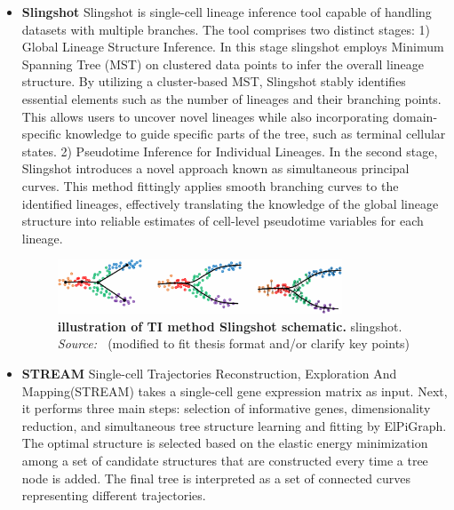 \begin{itemize}
    \item \textbf{Slingshot}
    Slingshot is single-cell lineage inference tool capable of handling datasets with multiple branches\citep{street2018slingshot}. The tool comprises two distinct stages: 1) Global Lineage Structure Inference. In this stage slingshot employs Minimum Spanning Tree (MST) on clustered data points to infer the overall lineage structure. By utilizing a cluster-based MST, Slingshot stably identifies essential elements such as the number of lineages and their branching points. This allows users to uncover novel lineages while also incorporating domain-specific knowledge to guide specific parts of the tree, such as terminal cellular states. 2) Pseudotime Inference for Individual Lineages. In the second stage, Slingshot introduces a novel approach known as simultaneous principal curves. This method fittingly applies smooth branching curves to the identified lineages, effectively translating the knowledge of the global lineage structure into reliable estimates of cell-level pseudotime variables for each lineage.
    \begin{figure}[ht!]
    	\centering
    	\includegraphics[width=0.8\textwidth]{TI_Alg_slingshot/fig}
    	\vspace{0.1cm}
    	\caption[Illustration of TI method Slingshot schematic.]{\textbf{illustration of TI method Slingshot schematic.}
    	slingshot. \emph{Source: ~\cite{street2018slingshot}}(modified to fit thesis format and/or clarify key points)
    	}
    	\label{fig:TI_Alg_slingshot}
    \end{figure}

    \item \textbf{STREAM}
    Single-cell Trajectories Reconstruction, Exploration And Mapping(STREAM) takes a single-cell gene expression matrix as input\citep{chen2019stream}. Next, it performs three main steps: selection of informative genes, dimensionality reduction, and simultaneous tree structure learning and fitting by ElPiGraph. The optimal structure is selected based on the elastic energy minimization among a set of candidate structures that are constructed every time a tree node is added. The final tree is interpreted as a set of connected curves representing different trajectories. 
    

\end{itemize}
